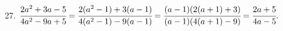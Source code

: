 27. $\cfrac{2a^2+3a-5}{4a^2-9a+5}=\cfrac{2(a^2-1)+3(a-1)}{4(a^2-1)-9(a-1)}=
\cfrac{(a-1)(2(a+1)+3)}{(a-1)(4(a+1)-9)}=\cfrac{2a+5}{4a-5}.$\\
